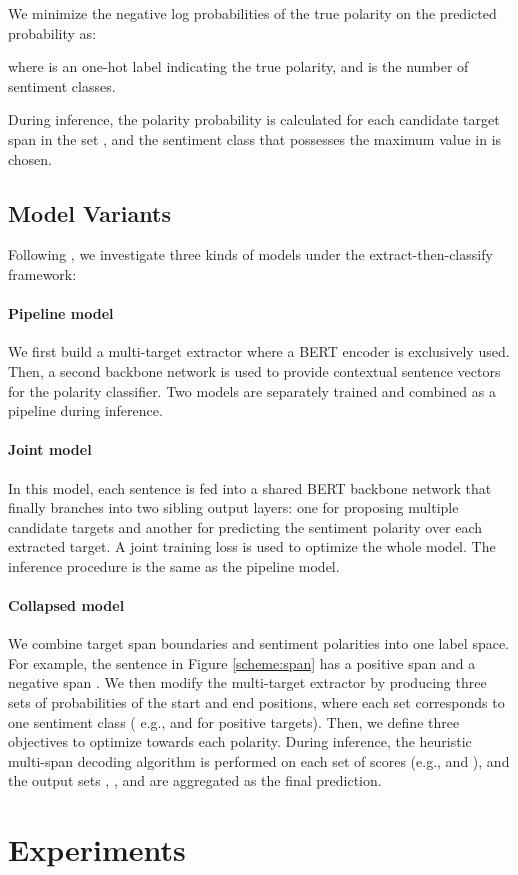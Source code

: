 \documentclass[11pt,a4paper]{article}
\begin{document}
We minimize the negative log probabilities of the true polarity on the predicted probability as:

where  is an one-hot label indicating the true polarity, and  is the number of sentiment classes.

During inference, the polarity probability is calculated for each candidate target span in the set , and the sentiment class that possesses the maximum value in  is chosen.

\subsection{Model Variants		\label{sec:models}}
Following \citet{mitchell2013open,zhang2015neural}, we investigate three kinds of models under the extract-then-classify framework:

\paragraph{Pipeline model}
We first build a multi-target extractor where a BERT encoder is exclusively used. 
Then, a second backbone network is used to provide contextual sentence vectors for the polarity classifier.
Two models are separately trained and combined as a pipeline during inference.


\paragraph{Joint model} 
In this model, each sentence is fed into a shared BERT backbone network that finally branches into two sibling output layers: one for proposing multiple candidate targets and another for predicting the sentiment polarity over each extracted target.
A joint training loss  is used to optimize the whole model.
The inference procedure is the same as the pipeline model.

\paragraph{Collapsed model}
We combine target span boundaries and sentiment polarities into one label space. 
For example, the sentence in Figure \ref{scheme:span} has a positive span  and a negative span .
We then modify the multi-target extractor by producing three sets of probabilities of the start and end positions, where each set corresponds to one sentiment class ( e.g.,  and  for positive targets).
Then, we define three objectives to optimize towards each polarity.
During inference, the heuristic multi-span decoding algorithm is performed on each set of scores (e.g.,  and ), and the output sets , , and  are aggregated as the final prediction. \section{Experiments}
\end{document}
